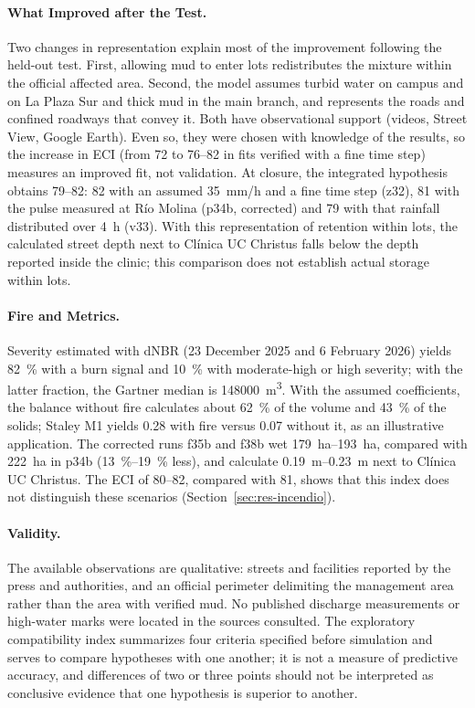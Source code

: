 \paragraph{What Improved after the Test.} Two changes in representation explain most of the improvement following the held-out test. First, allowing mud to enter lots redistributes the mixture within the official affected area. Second, the model assumes turbid water on campus and on La Plaza Sur and thick mud in the main branch, and represents the roads and confined roadways that convey it. Both have observational support (videos, Street View, Google Earth). Even so, they were chosen with knowledge of the results, so the increase in ECI (from 72 to 76--82 in fits verified with a fine time step) measures an improved fit, not validation. At closure, the integrated hypothesis obtains 79--82: 82 with an assumed \SI{35}{mm/h} and a fine time step (z32), 81 with the pulse measured at Río Molina (p34b, corrected) and 79 with that rainfall distributed over \SI{4}{h} (v33). With this representation of retention within lots, the calculated street depth next to Clínica UC Christus falls below the depth reported inside the clinic; this comparison does not establish actual storage within lots.

\paragraph{Fire and Metrics.} Severity estimated with dNBR (23 December 2025 and 6 February 2026) yields \SI{82}{\percent} with a burn signal and \SI{10}{\percent} with moderate-high or high severity; with the latter fraction, the Gartner median is \SI{148000}{m^3}. With the assumed coefficients, the balance without fire calculates about \SI{62}{\percent} of the volume and \SI{43}{\percent} of the solids; Staley M1 yields 0.28 with fire versus 0.07 without it, as an illustrative application. The corrected runs f35b and f38b wet \SIrange{179}{193}{ha}, compared with \SI{222}{ha} in p34b (\SIrange{13}{19}{\percent} less), and calculate \SIrange{0.19}{0.23}{m} next to Clínica UC Christus. The ECI of 80--82, compared with 81, shows that this index does not distinguish these scenarios (Section~\ref{sec:res-incendio}).

\paragraph{Validity.} The available observations are qualitative: streets and facilities reported by the press and authorities, and an official perimeter delimiting the management area rather than the area with verified mud. No published discharge measurements or high-water marks were located in the sources consulted. The exploratory compatibility index summarizes four criteria specified before simulation and serves to compare hypotheses with one another; it is not a measure of predictive accuracy, and differences of two or three points should not be interpreted as conclusive evidence that one hypothesis is superior to another.


